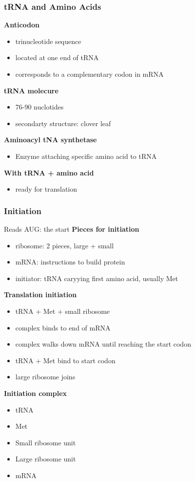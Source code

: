 \documentclass[11pt,fleqn]{book}
\begin{document}
\subsubsection{tRNA and Amino Acids}
\textbf{Anticodon}
\begin{itemize}
    \item trinucleotide sequence
    \item located at one end of tRNA
    \item corresponds to a complementary codon in mRNA
\end{itemize}
\textbf{tRNA molecure}
\begin{itemize}
    \item 76-90 nuclotides
    \item secondarty structure: clover leaf
\end{itemize}
\textbf{Aminoacyl tNA synthetase}
\begin{itemize}
    \item Enzyme attaching specific amino acid to tRNA
\end{itemize}
\textbf{With tRNA + amino acid}
\begin{itemize}
    \item ready for translation
\end{itemize}
\subsubsection{Initiation}
Reads AUG: the start
\textbf{Pieces for initiation}
\begin{itemize}
    \item ribosome: 2 pieces, large + small
    \item mRNA: instructions to build protein
    \item initiator: tRNA caryying first amino acid, usually Met
\end{itemize}
\textbf{Translation initiation}
\begin{itemize}
    \item tRNA + Met + small ribosome
    \item complex binds to end of mRNA
    \item complex walks down mRNA until reaching the start codon
    \item tRNA + Met bind to start codon
    \item large ribosome joins
\end{itemize}
\textbf{Initiation complex}
\begin{itemize}
    \item tRNA
    \item Met
    \item Small ribosome unit
    \item Large ribosome unit
    \item mRNA
\end{itemize}
\end{document}
